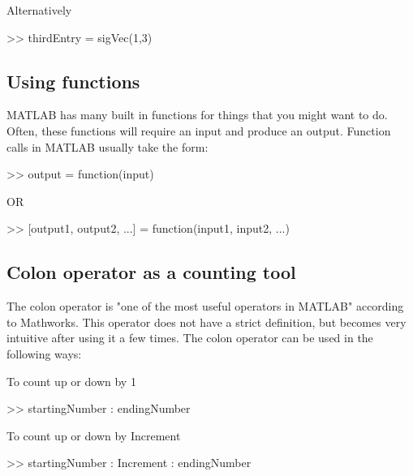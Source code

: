 \documentclass[11pt]{article}
\begin{document}
Alternatively
\begin{center}
{>> thirdEntry = sigVec(1,3)}

\end{center}

\subsection{Using functions}
MATLAB has many built in functions for things that you might want to do. Often, these functions will require an input and produce an output. Function calls in MATLAB usually take the form:\newline

\begin{center}

>> output = function(input)

\end{center}

\begin{center}

OR

\end{center}

\begin{center}

>> [output1, output2, ...] = function(input1, input2, ...)

\end{center}

\subsection{Colon operator as a counting tool}
The colon operator is "one of the most useful operators in MATLAB" according to Mathworks. This operator does not have a strict definition, but becomes very intuitive after using it a few times. The colon operator can be used in the following ways:\newline

\begin{center}

To count up or down by 1      

>> startingNumber : endingNumber


\end{center} 

\vspace{4mm}
\begin{center}


To count up or down by Increment

>> startingNumber : Increment : endingNumber

\end{center} 
\end{document}

